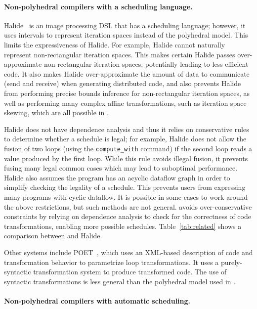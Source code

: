 \paragraph{Non-polyhedral compilers with a scheduling language.}
Halide~\cite{halide_12} is an image processing DSL that has a scheduling language; however, it uses intervals to represent iteration spaces instead of the polyhedral model.  This limits the expressiveness of Halide.
For example, Halide cannot naturally represent non-rectangular iteration spaces.  This makes certain Halide passes over-approximate non-rectangular iteration spaces, potentially leading to less efficient code.  It also makes Halide over-approximate the amount of data to communicate (send and receive) when generating distributed code,  and also prevents Halide from performing precise bounds inference for non-rectangular iteration spaces, as well as performing many complex affine transformations, such as iteration space skewing, which are all possible in \framework{}.

Halide does not have dependence analysis and thus it relies on conservative rules to determine whether a schedule is legal; for example, Halide does not allow the fusion of two loops (using the \texttt{compute\_with} command) if the second loop reads a value produced by the first loop.
While this rule avoids illegal fusion, it prevents fusing many legal common cases which may lead to suboptimal performance.
Halide also assumes the program has an acyclic dataflow graph in order to simplify checking the legality of a schedule. This prevents users from expressing many programs with cyclic dataflow.
It is possible in some cases to work around the above restrictions, but such methods are not general.
\framework{} avoids over-conservative constraints by relying on dependence analysis to check for the correctness of code transformations, enabling more possible schedules.  Table~\ref{tab:related} shows a comparison between \framework{} and Halide.

Other systems include POET~\cite{Yi:2007ay}, which uses an XML-based description of code and transformation behavior to parametrize loop transformations.  It uses a purely-syntactic transformation system to produce transformed code.  The use of syntactic transformations is less general than the polyhedral model used in \framework.

\paragraph{Non-polyhedral compilers with automatic scheduling.}

